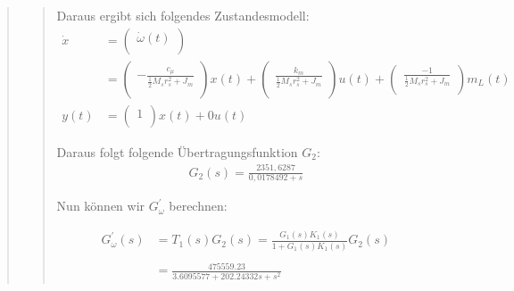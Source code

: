 \begin{quote}
\begin{quote}
        Daraus ergibt sich folgendes Zustandesmodell:
        \begin{equation*}
            \begin{split}
                   \dot{x} &=
                   \begin{pmatrix}
                        \dot{\omega}(t)\\
                   \end{pmatrix}\\ &=
                   \begin{pmatrix}
                        -\frac{c_\mu}{\frac{1}{2}M_s r^2_s + J_m}\\
                   \end{pmatrix} x(t) +
                   \begin{pmatrix}
                       \frac{k_m}{\frac{1}{2}M_sr^2_s + J_m}\\
                   \end{pmatrix} u(t) +
                   \begin{pmatrix}
                       \frac{-1}{\frac{1}{2}M_sr^2_s + J_m}\\
                   \end{pmatrix} m_L(t)\\
                   y(t) &= 
                   \begin{pmatrix}
                        1\\
                   \end{pmatrix} x(t) + 0u(t)
            \end{split}
        \end{equation*}
        
        Daraus folgt folgende Übertragungsfunktion $G_2$:
        \begin{equation*}
        	\begin{split}
        		G_2 (s) = \frac{2351,6287}{0,0178492 + s}
        	\end{split}
        \end{equation*}
        
        Nun können wir $G_\omega^{'}$ berechnen:
	
		\begin{equation*}
        	\begin{split}
        		G_\omega^{'} (s) &= T_1(s) G_2(s) = \frac{G_1 (s) K_1(s)}{1 + G_1 (s) K_1 (s)} G_2 (s)\\ \\
        		&= \frac{475559.23}{3.6095577 + 202.24332s + s^2}
        	\end{split}
        \end{equation*}
		

\end{quote}
\end{quote}
